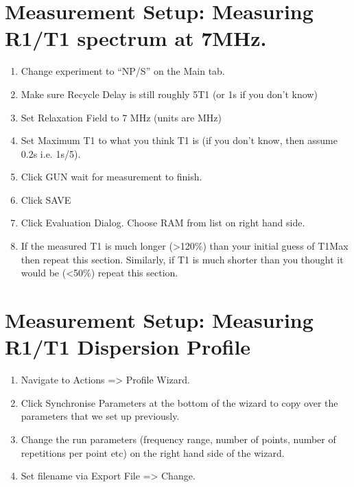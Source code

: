 \documentclass[letterpaper,10pt,english]{sphinxmanual}
\begin{document}
\section{Measurement Setup: Measuring R1/T1 spectrum at 7MHz.}
\label{\detokenize{stelar-ffc:measurement-setup-measuring-r1-t1-spectrum-at-7mhz}}\begin{enumerate}
%
\item {} 
\sphinxAtStartPar
Change experiment to “NP/S” on the Main tab.

\item {} 
\sphinxAtStartPar
Make sure Recycle Delay is still roughly 5T1 (or 1s if you don’t know)

\item {} 
\sphinxAtStartPar
Set Relaxation Field to 7 MHz (units are MHz)

\item {} 
\sphinxAtStartPar
Set Maximum T1 to what you think T1 is (if you don’t know, then assume 0.2s i.e. 1s/5).

\item {} 
\sphinxAtStartPar
Click GUN \sphinxhyphen{} wait for measurement to finish.

\item {} 
\sphinxAtStartPar
Click SAVE

\item {} 
\sphinxAtStartPar
Click Evaluation Dialog. Choose RAM from list on right hand side.

\item {} 
\sphinxAtStartPar
If the measured T1 is much longer (\textgreater{}120\%) than your initial guess of T1Max then repeat this section. Similarly, if T1 is much shorter than you thought it would be (\textless{}50\%) repeat this section.

\end{enumerate}


\section{Measurement Setup: Measuring R1/T1 Dispersion Profile}
\label{\detokenize{stelar-ffc:measurement-setup-measuring-r1-t1-dispersion-profile}}\begin{enumerate}
%
\item {} 
\sphinxAtStartPar
Navigate to Actions =\textgreater{} Profile Wizard.

\item {} 
\sphinxAtStartPar
Click Synchronise Parameters at the bottom of the wizard to copy over the parameters that we set up previously.

\item {} 
\sphinxAtStartPar
Change the run parameters (frequency range, number of points, number of repetitions per point etc) on the right hand side of the wizard.

\item {} 
\sphinxAtStartPar
Set filename via Export File =\textgreater{} Change.

\end{enumerate}
\end{document}

